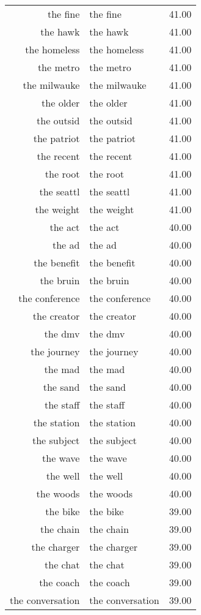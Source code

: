 \begin{table}[ht]
\begin{tabular}{rlr}
  the fine & the fine & 41.00 \\ 
  the hawk & the hawk & 41.00 \\ 
  the homeless & the homeless & 41.00 \\ 
  the metro & the metro & 41.00 \\ 
  the milwauke & the milwauke & 41.00 \\ 
  the older & the older & 41.00 \\ 
  the outsid & the outsid & 41.00 \\ 
  the patriot & the patriot & 41.00 \\ 
  the recent & the recent & 41.00 \\ 
  the root & the root & 41.00 \\ 
  the seattl & the seattl & 41.00 \\ 
  the weight & the weight & 41.00 \\ 
  the act & the act & 40.00 \\ 
  the ad & the ad & 40.00 \\ 
  the benefit & the benefit & 40.00 \\ 
  the bruin & the bruin & 40.00 \\ 
  the conference & the conference & 40.00 \\ 
  the creator & the creator & 40.00 \\ 
  the dmv & the dmv & 40.00 \\ 
  the journey & the journey & 40.00 \\ 
  the mad & the mad & 40.00 \\ 
  the sand & the sand & 40.00 \\ 
  the staff & the staff & 40.00 \\ 
  the station & the station & 40.00 \\ 
  the subject & the subject & 40.00 \\ 
  the wave & the wave & 40.00 \\ 
  the well & the well & 40.00 \\ 
  the woods & the woods & 40.00 \\ 
  the bike & the bike & 39.00 \\ 
  the chain & the chain & 39.00 \\ 
  the charger & the charger & 39.00 \\ 
  the chat & the chat & 39.00 \\ 
  the coach & the coach & 39.00 \\ 
  the conversation & the conversation & 39.00 \\ 

\end{tabular}
\end{table}
